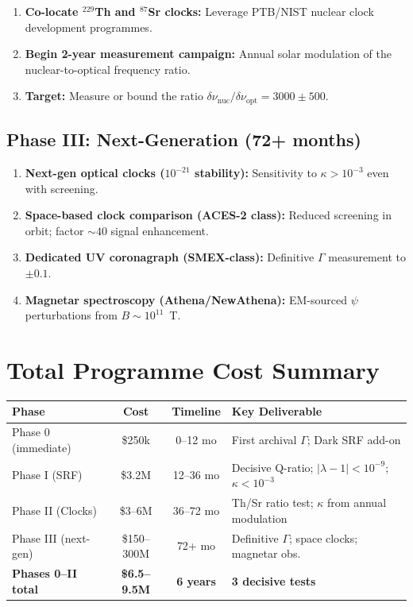 \documentclass[11pt]{article}
\newcommand{\lbone}{|\lambda - 1|}
\begin{document}
\begin{enumerate}
\item \textbf{Co-locate $^{229}$Th and $^{87}$Sr clocks:}
Leverage PTB/NIST nuclear clock development programmes.

\item \textbf{Begin 2-year measurement campaign:}  Annual solar
modulation of the nuclear-to-optical frequency ratio.

\item \textbf{Target:}  Measure or bound the ratio
$\delta\nu_{\text{nuc}}/\delta\nu_{\text{opt}} = 3000 \pm 500$.
\end{enumerate}

\subsection{Phase III: Next-Generation (72+ months)}

\begin{enumerate}
\item \textbf{Next-gen optical clocks ($10^{-21}$ stability):}
Sensitivity to $\kappa > 10^{-3}$ even with screening.

\item \textbf{Space-based clock comparison (ACES-2 class):}
Reduced screening in orbit; factor $\sim 40$ signal enhancement.

\item \textbf{Dedicated UV coronagraph (SMEX-class):}
Definitive $\Gamma$ measurement to $\pm 0.1$.

\item \textbf{Magnetar spectroscopy (Athena/NewAthena):}
EM-sourced $\psi$ perturbations from $B \sim 10^{11}$~T.
\end{enumerate}

\section{Total Programme Cost Summary}
\label{sec:total-cost}

\begin{center}
\begin{tabular}{lccl}
\toprule
\textbf{Phase} & \textbf{Cost} & \textbf{Timeline}
& \textbf{Key Deliverable} \\
\midrule
Phase 0 (immediate) & \$250k & 0--12 mo &
  First archival $\Gamma$; Dark SRF add-on \\
Phase I (SRF) & \$3.2M & 12--36 mo &
  Decisive Q-ratio; $\lbone < 10^{-9}$; $\kappa < 10^{-3}$ \\
Phase II (Clocks) & \$3--6M & 36--72 mo &
  Th/Sr ratio test; $\kappa$ from annual modulation \\
Phase III (next-gen) & \$150--300M & 72+ mo &
  Definitive $\Gamma$; space clocks; magnetar obs. \\
\midrule
\textbf{Phases 0--II total} & \textbf{\$6.5--9.5M} &
  \textbf{6 years} & \textbf{3 decisive tests} \\
\bottomrule
\end{tabular}
\end{center}
\end{document}

